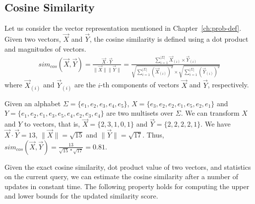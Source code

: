 \subsection{Cosine Similarity} 
\begin{definition}\label{def:cosine}
Let us consider the vector representation mentioned in Chapter~\ref{ch:prob-def}. Given two vectors, $\vec{X}$ and $\vec{Y}$, the cosine similarity is defined using a dot product and magnitudes of vectors. 
\begin{align*}   
sim_{cos}(\vec{X}, \vec{Y}) =\frac{\vec{X} \cdot \vec{Y}} {\| \vec{X} \| \| \vec{Y} \|}=\frac{\sum_{i=1}^{|\Sigma|}\vec{X}_{(i)} \times \vec{Y}_{(i)}}{\sqrt{\sum_{i=1}^{|\Sigma|}(\vec{X}_{(i)})^2} \times \sqrt{\sum_{i=1}^{|\Sigma|}(\vec{Y}_{(i)})^2}}
\end{align*}  
where $\vec{X}_{(i)}$ and $\vec{Y}_{(i)}$ are the $i$-th components of vectors $\vec{X}$ and $\vec{Y}$, respectively.  
\end{definition}

\begin{example}\label{example:comp-cos}
Given an alphabet $\Sigma=\{e_1, e_2, e_3, e_4, e_5\}$, $X= \{e_3, e_2, e_2, e_1, e_5, e_2, e_1\}$ and $Y = \{e_1, e_2, e_1, e_3, e_5, e_4, e_2, e_3, e_4\}$ are two multisets over $\Sigma$. We can transform $X$ and $Y$ to vectors, that is, $\vec{X} = \{2, 3, 1, 0, 1\}$ and $\vec{Y} = \{2, 2, 2, 2, 1\}$. We have $\vec{X}\cdot \vec{Y} = 13$, $\|\vec{X}\| = \sqrt{15}$ and $\|\vec{Y}\| = \sqrt{17}$. Thus, $sim_{cos}(\vec{X}, \vec{Y}) = \frac{13}{\sqrt{15}*\sqrt{17}} = 0.81$.  
\end{example}

Given the exact cosine similarity, dot product value of two vectors, and statistics on the current query, we can estimate the cosine similarity after a number of updates in constant time. The following property holds for computing the upper and lower bounds for the updated similarity score.

